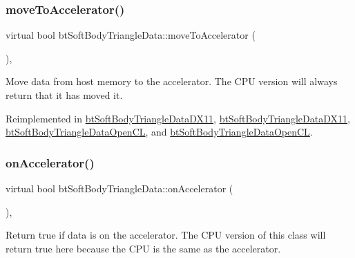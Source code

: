 \subsubsection{\texorpdfstring{move\+To\+Accelerator()}{moveToAccelerator()}\hspace{0.1cm}{\footnotesize\ttfamily [2/2]}}
{\footnotesize\ttfamily virtual bool bt\+Soft\+Body\+Triangle\+Data\+::move\+To\+Accelerator (\begin{DoxyParamCaption}{ }\end{DoxyParamCaption})\hspace{0.3cm}{\ttfamily [inline]}, {\ttfamily [virtual]}}

Move data from host memory to the accelerator. The C\+PU version will always return that it has moved it. 

Reimplemented in \hyperlink{classbtSoftBodyTriangleDataDX11_aa3d2af489f6521cdd95c152f49fcedff}{bt\+Soft\+Body\+Triangle\+Data\+D\+X11}, \hyperlink{classbtSoftBodyTriangleDataDX11_a6885a4e276703f9dd643fab1d6035586}{bt\+Soft\+Body\+Triangle\+Data\+D\+X11}, \hyperlink{classbtSoftBodyTriangleDataOpenCL_af92cd6a17855e603e73595ad229986f5}{bt\+Soft\+Body\+Triangle\+Data\+Open\+CL}, and \hyperlink{classbtSoftBodyTriangleDataOpenCL_a7b9ed62bd458f1397041d6e6bdae44bb}{bt\+Soft\+Body\+Triangle\+Data\+Open\+CL}.

\mbox{\label{classbtSoftBodyTriangleData_a7e461faee6801a25e4ccdf108d55ed54}} 
\subsubsection{\texorpdfstring{on\+Accelerator()}{onAccelerator()}\hspace{0.1cm}{\footnotesize\ttfamily [1/2]}}
{\footnotesize\ttfamily virtual bool bt\+Soft\+Body\+Triangle\+Data\+::on\+Accelerator (\begin{DoxyParamCaption}{ }\end{DoxyParamCaption})\hspace{0.3cm}{\ttfamily [inline]}, {\ttfamily [virtual]}}

Return true if data is on the accelerator. The C\+PU version of this class will return true here because the C\+PU is the same as the accelerator. 

